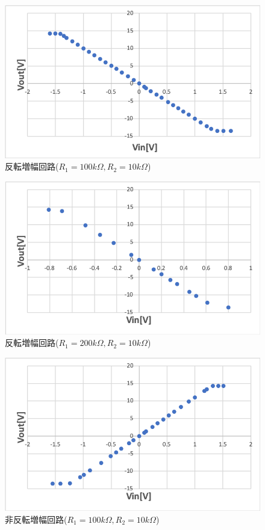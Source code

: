 \documentclass[11pt, a4paper,twocolumn]{jarticle}
\begin{document}
\begin{figure}[htbp]
 \begin{center}
  \includegraphics[width=0.8\linewidth]{fig19.png}
 \end{center}
 \caption{反転増幅回路($R_1=100k\Omega,R_2=10k\Omega$)}
 \label{fig:19}
\end{figure}

\begin{figure}[htbp]
 \begin{center}
  \includegraphics[width=0.8\linewidth]{fig20.png}
 \end{center}
 \caption{反転増幅回路($R_1=200k\Omega,R_2=10k\Omega$)}
 \label{fig:20}
\end{figure}

\newpage

\begin{figure}[htbp]
 \begin{center}
  \includegraphics[width=0.8\linewidth]{fig21.png}
 \end{center}
 \caption{非反転増幅回路($R_1=100k\Omega,R_2=10k\Omega$)}
 \label{fig:21}
\end{figure}
\end{document}
